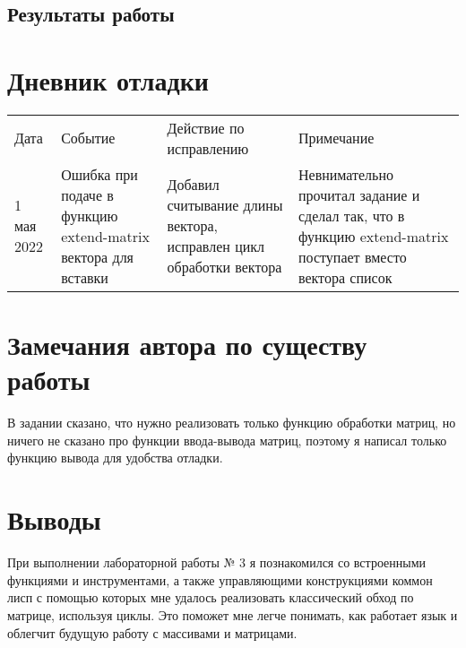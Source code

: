 \documentclass[12pt]{article}
\begin{document}
\pagebreak
\subsection{Результаты работы}


\pagebreak
\section{Дневник отладки}
\begin{tabular}{|p{50pt}|p{80pt}|p{140pt}|p{140pt}|}
\hline
Дата & Событие & Действие по исправлению & Примечание \\
1 мая 2022 & Ошибка при подаче в функцию extend-matrix вектора для вставки & Добавил считывание длины вектора, исправлен цикл обработки вектора & Невнимательно прочитал задание и сделал так, что в функцию extend-matrix поступает вместо вектора список\\
\hline
\end{tabular}

\section{Замечания автора по существу работы}
В задании сказано, что нужно реализовать только функцию обработки матриц, но ничего не сказано про функции ввода-вывода матриц, поэтому я написал только функцию вывода для удобства отладки.


\section{Выводы}
При выполнении лабораторной работы № 3 я познакомился со встроенными функциями и инструментами, а также управляющими конструкциями коммон лисп с помощью которых
мне удалось реализовать классический обход по матрице, используя циклы. Это поможет мне легче понимать, как работает язык и облегчит будущую работу с массивами и
матрицами.
\end{document}
